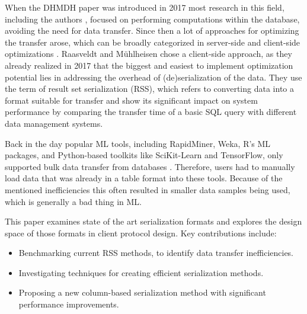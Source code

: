 \documentclass[sigconf]{acmart}
\begin{document}
When the DHMDH paper was introduced in 2017 most research in this field, including the authors \cite{raasveldt2016vectorized}, focused on performing computations within the database, avoiding the need for data transfer. Since then a lot of approaches for optimizing the transfer arose, which can be broadly categorized in server-side and client-side optimizations \cite{neueres paper}. Raasveldt and Mühlheisen chose a client-side approach, as they already realized in 2017 that the biggest and easiest to implement optimization potential lies in addressing the overhead of (de)serialization of the data. 
They use the term of result set serialization (RSS), which refers to converting data into a format suitable for transfer and show its significant impact on system performance by comparing the transfer time of a basic SQL query with different data management systems. 

Back in the day popular ML tools, including RapidMiner, Weka, R's ML packages, and Python-based toolkits like SciKit-Learn and TensorFlow, only supported bulk data transfer from databases \cite{viele papperpereper}. Therefore, users had to manually load data that was already in a table format into these tools. Because of the mentioned inefficiencies this often resulted in smaller data samples being used, which is generally a bad thing in ML.

This paper examines state of the art serialization formats and explores the design space of those formats in client protocol design.
Key contributions include:
\begin{itemize}
  \item Benchmarking current RSS methods, to identify data transfer inefficiencies.
  \item Investigating techniques for creating efficient serialization methods.
  \item Proposing a new column-based serialization method with significant performance improvements.
\end{itemize}
\end{document}
